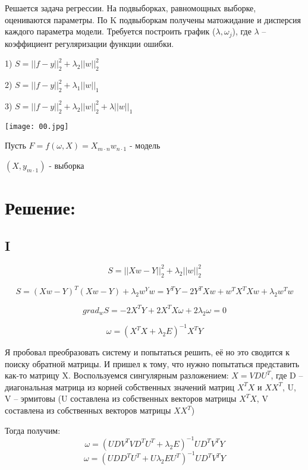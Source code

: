 \documentclass[a4paper,14pt]{article} %
\begin{document}
Решается задача регрессии.
На подвыборках, равномощных выборке, оцениваются параметры. По K подвыборкам получены матожидание и дисперсия 
каждого параметра модели. Требуется построить график ($\lambda, \omega_j$), где $\lambda $ -- коэффициент регуляризации
функции ошибки.	


1) $S = ||f-y||_2^2 + \lambda_2||w||_2^2$

2) $S = ||f-y||_2^2 + \lambda_1||w||_1$

3) $S = ||f-y||_2^2 + \lambda_2||w||_2^2 + \lambda||w||_1$

\texttt{[image: 00.jpg]}


Пусть $F = f(\omega, X) = X_{m \cdot n} w_{n \cdot 1}$ - модель

$(X, y_{m \cdot 1})$ - выборка

\newpage
\section{Решение:}
\subsection{I}
\begin{equation}
S = ||Xw - Y||_2^2 + \lambda_2||w||_2^2
\end{equation}

\begin{equation}
S = (Xw - Y)^T(Xw-Y) + \lambda_2w^Yw = Y^TY - 2Y^TXw + w^TX^TXw + \lambda_2w^Tw
\end{equation}

\begin{equation}
grad_wS = -2X^TY+2X^TX\omega+2\lambda_2\omega = 0
\end{equation}

\begin{equation}
\omega = (X^TX + \lambda_2E)^{-1}X^TY
\end{equation}

Я пробовал преобразовать систему и попытаться решить, её но это сводится к поиску обратной матрицы.
И пришел к тому, что нужно попытаться представить как-то матрицу X.
Воспользуемся сингулярным разложением: $X = V D U^T$, где D -- диагональная матрица из корней собственных значений матриц $X^TX$ и $XX^T$, U, V -- эрмитовы (U составлена из собственных векторов матрицы $X^TX$, V составлена из собственных векторов матрицы $XX^T$)

Тогда получим:
\begin{equation}
    \omega = (U D V^T V D^T U^T + \lambda_2 E)^{-1}UD^TV^TY
\end{equation}
\begin{equation}
    \omega = (U DD^T U^T + U \lambda_2 EU^T)^{-1}UD^TV^TY
\end{equation}
\end{document}

